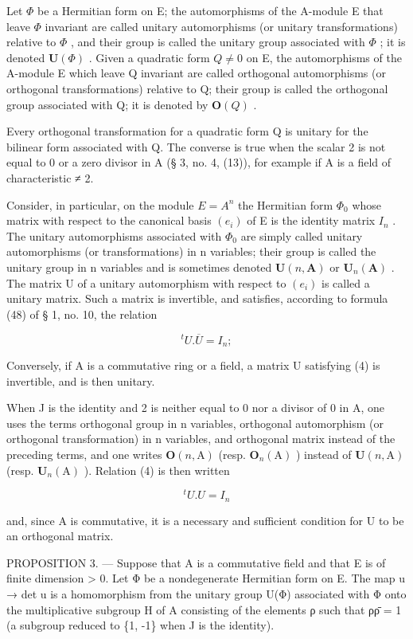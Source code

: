 Let \(\Phi\) be a Hermitian form on E; the automorphisms of the A-module E that leave \(\Phi\) invariant are called unitary automorphisms (or unitary transformations) relative to \(\Phi\) , and their group is called the unitary group associated with \(\Phi\) ; it is denoted \(\mathbf{U}(\Phi)\) . Given a quadratic form \(Q \neq 0\) on E, the automorphisms of the A-module E which leave Q invariant are called orthogonal automorphisms (or orthogonal transformations) relative to Q; their group is called the orthogonal group associated with Q; it is denoted by \(\mathbf{O}(Q)\) .

Every orthogonal transformation for a quadratic form Q is unitary for the bilinear form associated with Q. The converse is true when the scalar 2 is not equal to 0 or a zero divisor in A (§ 3, no. 4, (13)), for example if A is a field of characteristic ≠ 2.

Consider, in particular, on the module \(E = A^{n}\) the Hermitian form \(\Phi_{0}\) whose matrix with respect to the canonical basis \((e_{i})\) of E is the identity matrix \(I_{n}\) . The unitary automorphisms associated with \(\Phi_{0}\) are simply called unitary automorphisms (or transformations) in n variables; their group is called the unitary group in n variables and is sometimes denoted \(\mathbf{U}(n, \mathbf{A})\) or \(\mathbf{U}_{n}(\mathbf{A})\) . The matrix U of a unitary automorphism with respect to \((e_{i})\) is called a unitary matrix. Such a matrix is invertible, and satisfies, according to formula (48) of § 1, no. 10, the relation

\[
{ } ^ { t } U . \overline { { U } } = I _ { n } ;\tag{4}
\]

Conversely, if A is a commutative ring or a field, a matrix U satisfying (4) is invertible, and is then unitary.

When J is the identity and 2 is neither equal to 0 nor a divisor of 0 in A, one uses the terms orthogonal group in n variables, orthogonal automorphism (or orthogonal transformation) in n variables, and orthogonal matrix instead of the preceding terms, and one writes \(\mathbf{O}(n,\mathrm{A})\) (resp. \(\mathbf{O}_n(\mathrm{A})\) ) instead of \(\mathbf{U}(n,\mathrm{A})\) (resp. \(\mathbf{U}_n(\mathrm{A})\) ). Relation (4) is then written

\[
{ } ^ { t } U . U = I _ { n }\tag{5}
\]

and, since A is commutative, it is a necessary and sufficient condition for U to be an orthogonal matrix.

PROPOSITION 3. --- Suppose that A is a commutative field and that E is of finite dimension \textgreater{} 0. Let Φ be a nondegenerate Hermitian form on E. The map u → det u is a homomorphism from the unitary group U(Φ) associated with Φ onto the multiplicative subgroup H of A consisting of the elements ρ such that ρρ̄ = 1 (a subgroup reduced to \{1, -1\} when J is the identity).

